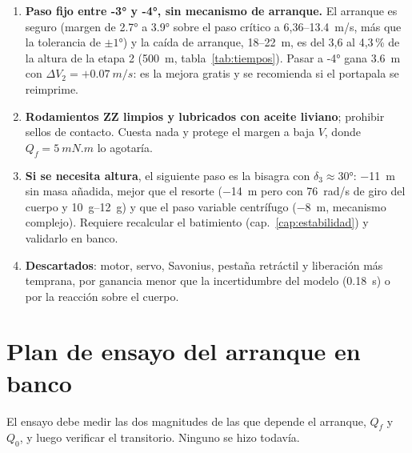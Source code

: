 \begin{resultado}[Recomendación]
\begin{enumerate}
  \item \textbf{Paso fijo entre \ang{-3} y \ang{-4}, sin mecanismo de arranque.} El arranque es
        seguro (margen de \ang{2.7} a \ang{3.9} sobre el paso crítico a 6,36--\SI{13.4}{m/s},
        más que la tolerancia de $\pm\ang{1}$) y la caída de arranque, 18--\SI{22}{m}, es del
        3,6 al 4,3\,\% de la altura de la etapa 2 (\SI{500}{m}, tabla~\ref{tab:tiempos}). Pasar a \ang{-4} gana \SI{3.6}{m} con
        $\Delta V_2=+\SI{0.07}{m/s}$: es la mejora gratis y se recomienda si el portapala
        se reimprime.
  \item \textbf{Rodamientos ZZ limpios y lubricados con aceite liviano}; prohibir sellos de
        contacto. Cuesta nada y protege el margen a baja $V$, donde
        $Q_f=\SI{5}{mN.m}$ lo agotaría.
  \item \textbf{Si se necesita altura}, el siguiente paso es la bisagra con
        $\delta_3\approx\ang{30}$: \SI{-11}{m} sin masa añadida, mejor que el resorte
        (\SI{-14}{m} pero con \SI{76}{rad/s} de giro del cuerpo y \SIrange{10}{12}{g}) y que el paso
        variable centrífugo (\SI{-8}{m}, mecanismo complejo). Requiere recalcular el
        batimiento (cap.~\ref{cap:estabilidad}) y validarlo en banco.
  \item \textbf{Descartados}: motor, servo, Savonius, pestaña retráctil y liberación más
        temprana, por ganancia menor que la incertidumbre del modelo
        (\SI{0.18}{s}) o por la reacción sobre el cuerpo.
\end{enumerate}
\end{resultado}

\section{Plan de ensayo del arranque en banco}\label{sec:arranque-ensayo}

El ensayo debe medir las dos magnitudes de las que depende el arranque, $Q_f$ y $Q_0$, y
luego verificar el transitorio. Ninguno se hizo todavía.

